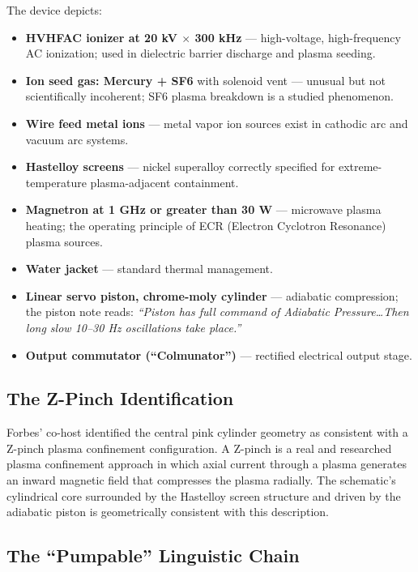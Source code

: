\documentclass[11pt]{article}
\begin{document}
The device depicts:

\begin{itemize}
  \item \textbf{HVHFAC ionizer at 20 kV $\times$ 300 kHz} — high-voltage, high-frequency AC ionization; used in dielectric barrier discharge and plasma seeding.
  \item \textbf{Ion seed gas: Mercury + SF6} with solenoid vent — unusual but not scientifically incoherent; SF6 plasma breakdown is a studied phenomenon.
  \item \textbf{Wire feed metal ions} — metal vapor ion sources exist in cathodic arc and vacuum arc systems.
  \item \textbf{Hastelloy screens} — nickel superalloy correctly specified for extreme-temperature plasma-adjacent containment.
  \item \textbf{Magnetron at 1 GHz or greater than 30 W} — microwave plasma heating; the operating principle of ECR (Electron Cyclotron Resonance) plasma sources.
  \item \textbf{Water jacket} — standard thermal management.
  \item \textbf{Linear servo piston, chrome-moly cylinder} — adiabatic compression; the piston note reads: \emph{``Piston has full command of Adiabatic Pressure\ldots Then long slow 10--30 Hz oscillations take place.''}
  \item \textbf{Output commutator (``Colmunator'')} — rectified electrical output stage.
\end{itemize}

\subsection{The Z-Pinch Identification}

Forbes' co-host identified the central pink cylinder geometry as consistent with a Z-pinch plasma confinement configuration. A Z-pinch is a real and researched plasma confinement approach in which axial current through a plasma generates an inward magnetic field that compresses the plasma radially. The schematic's cylindrical core surrounded by the Hastelloy screen structure and driven by the adiabatic piston is geometrically consistent with this description.

\subsection{The ``Pumpable'' Linguistic Chain}
\end{document}
